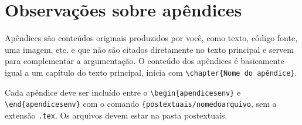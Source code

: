 \chapter{Observações sobre apêndices}

Apêndices são conteúdos originais produzidos por você, como texto, código fonte, uma imagem, etc. e que não são citados diretamente no texto principal e servem para complementar a argumentação. O conteúdo dos apêndices é basicamente igual a um capítulo do texto principal, inicia com \verb|\chapter{Nome do apêndice}|. 

Cada apêndice deve ser incluído entre o \verb|\begin{apendicesenv}| e \verb|\end{apendicesenv}| com o comando \verb|{postextuais/nomedoarquivo|, sem a extensão \verb|.tex|. Os arquivos devem estar na pasta postextuais.